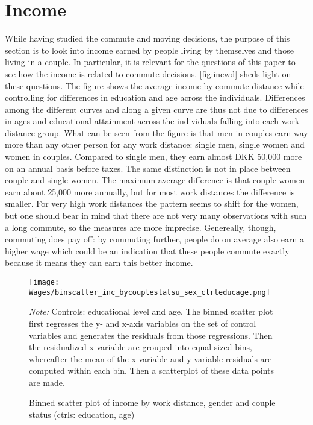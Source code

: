 \section{Income}\label{sec:inc}
While having studied the commute and moving decisions, the purpose of this section is to look into income earned by people living by themselves and those living in a couple. In particular, it is relevant for the questions of this paper to see how the income is related to commute decisions. \autoref{fig:incwd} sheds light on these questions. The figure shows the average income by commute distance while controlling for differences in education and age across the individuals. Differences among the different curves and along a given curve are thus not due to differences in ages and educational attainment across the individuals falling into each work distance group. What can be seen from the figure is that men in couples earn way more than any other person for any work distance: single men, single women and women in couples. Compared to single men, they earn almost DKK 50,000 more on an annual basis before taxes. The same distinction is not in place between couple and single women. The maximum average difference is that couple women earn about 25,000 more annually, but for most work distances the difference is smaller. For very high work distances the pattern seems to shift for the women, but one should bear in mind that there are not very many observations with such a long commute, so the measures are more imprecise. Genereally, though, commuting does pay off: by commuting further, people do on average also earn a higher wage which could be an indication that these people commute exactly because it means they can earn this better income.
\begin{figure}[!htb]
\centering
\begin{minipage}{0.8\textwidth}
\texttt{[image: Wages/binscatter\_inc\_bycouplestatsu\_sex\_ctrleducage.png]} 
{\tiny \emph{Note:} Controls: educational level and age. The binned scatter plot first regresses the y- and x-axis variables on the set of control variables and generates the residuals from those regressions. Then the residualized x-variable are grouped into equal-sized bins, whereafter the mean of the x-variable and y-variable residuals are computed within each bin. Then a scatterplot of these data points are made.\par}
\end{minipage}
\caption{Binned scatter plot of income by work distance, gender and couple status (ctrls: education, age)}
\label{fig:incwd}
\end{figure}

